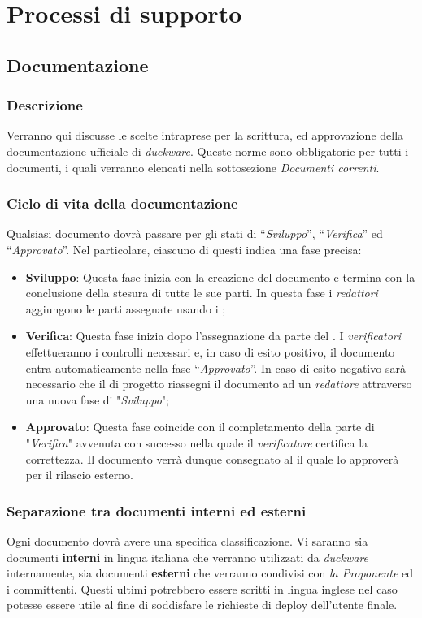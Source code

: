 \clearpage
\section{Processi di supporto}
\subsection{Documentazione}
\subsubsection{Descrizione}
Verranno qui discusse le scelte intraprese per la scrittura,  ed approvazione della documentazione ufficiale di \emph{duckware}. Queste norme sono obbligatorie per tutti i documenti, i quali verranno elencati nella sottosezione \emph{Documenti correnti}.
\subsubsection{Ciclo di vita della documentazione}
Qualsiasi documento dovrà passare per gli stati di “\emph{Sviluppo}”, “\emph{Verifica}” ed “\emph{Approvato}”. Nel particolare, ciascuno di questi indica una fase precisa:
\begin{itemize}
	\item \textbf{Sviluppo}: Questa fase inizia con la creazione del documento e termina con la conclusione della stesura di tutte le sue parti. In questa fase i \emph{redattori} aggiungono le parti assegnate usando i ;
	\item \textbf{Verifica}: Questa fase inizia dopo l’assegnazione da parte del \emph{}. I \emph{verificatori} effettueranno i controlli necessari e, in caso di esito positivo, il documento entra automaticamente nella fase “\emph{Approvato}”. In caso di esito negativo sarà necessario che il \emph{} di progetto riassegni il documento ad un \emph{redattore} attraverso una nuova fase di "\emph{Sviluppo}";
	\item \textbf{Approvato}: Questa fase coincide con il completamento della parte di "\emph{Verifica}" avvenuta con successo nella quale il \emph{verificatore} certifica la correttezza. Il documento verrà dunque consegnato al \emph{} il quale lo approverà per il rilascio esterno.
\end{itemize}

\subsubsection{Separazione tra documenti interni ed esterni}
Ogni documento dovrà avere una specifica classificazione. Vi saranno sia documenti \textbf{interni} in lingua italiana che verranno utilizzati da \emph{duckware} internamente, sia documenti \textbf{esterni} che verranno condivisi con \emph{la Proponente} ed i committenti. Questi ultimi potrebbero essere scritti in lingua inglese nel caso potesse essere utile al fine di soddisfare le richieste di deploy dell’utente finale.


